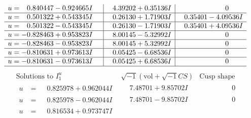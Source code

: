 \documentclass[1p]{elsarticle_modified}
\theoremstyle{definition}
\newcommand{\I}{\sqrt{-1}}
\begin{document}
$$\begin{array}{c|c|c}
\begin{aligned}
u &= \phantom{-}0.840447 - 0.924665 I\end{aligned}
 & \phantom{-}4.39202 + 0.35136 I & \phantom{-0.000000 } 0 \\ \hline\begin{aligned}
u &= \phantom{-}0.501322 + 0.543345 I\end{aligned}
 & \phantom{-}0.26130 + 1.71903 I & \phantom{-}0.35401 - 4.09536 I \\ \hline\begin{aligned}
u &= \phantom{-}0.501322 - 0.543345 I\end{aligned}
 & \phantom{-}0.26130 - 1.71903 I & \phantom{-}0.35401 + 4.09536 I \\ \hline\begin{aligned}
u &= -0.828463 + 0.953823 I\end{aligned}
 & \phantom{-}8.00145 - 5.32992 I & \phantom{-0.000000 } 0 \\ \hline\begin{aligned}
u &= -0.828463 - 0.953823 I\end{aligned}
 & \phantom{-}8.00145 + 5.32992 I & \phantom{-0.000000 } 0 \\ \hline\begin{aligned}
u &= -0.810631 + 0.973613 I\end{aligned}
 & \phantom{-}0.05425 - 6.68536 I & \phantom{-0.000000 } 0 \\ \hline\begin{aligned}
u &= -0.810631 - 0.973613 I\end{aligned}
 & \phantom{-}0.05425 + 6.68536 I & \phantom{-0.000000 } 0\\
 \hline 
 \end{array}$$\newpage$$\begin{array}{c|c|c}  
\text{Solutions to }I^u_{1}& \I (\text{vol} + \sqrt{-1}CS) & \text{Cusp shape}\\
 \hline 
\begin{aligned}
u &= \phantom{-}0.825978 + 0.962044 I\end{aligned}
 & \phantom{-}7.48701 + 9.85702 I & \phantom{-0.000000 } 0 \\ \hline\begin{aligned}
u &= \phantom{-}0.825978 - 0.962044 I\end{aligned}
 & \phantom{-}7.48701 - 9.85702 I & \phantom{-0.000000 } 0 \\ \hline\begin{aligned}
u &= \phantom{-}0.816534 + 0.973747 I\end{aligned}

\end{array}$$
\end{document}
